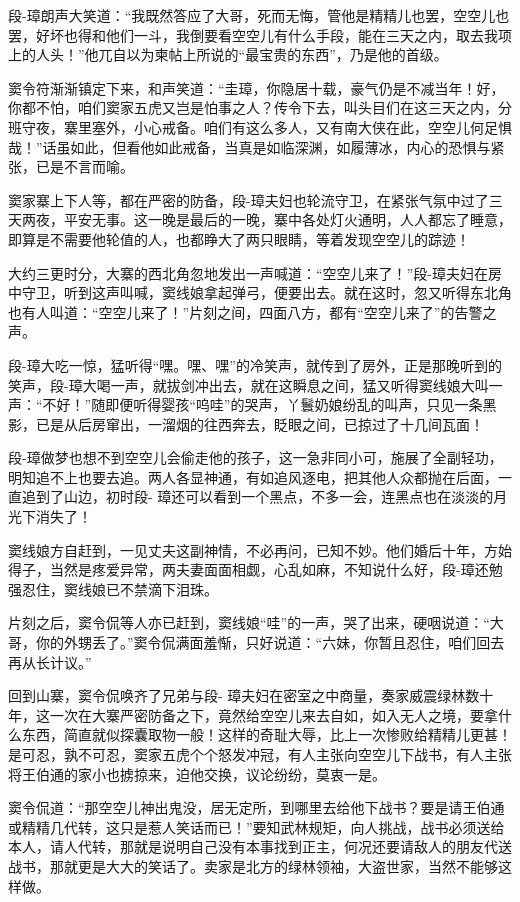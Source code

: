 \documentclass[12pt,oneside]{book}
\begin{document}
段-璋朗声大笑道：``我既然答应了大哥，死而无悔，管他是精精儿也罢，空空儿也罢，好坏也得和他们一斗，我倒要看空空儿有什么手段，能在三天之内，取去我项上的人头！''他兀自以为柬帖上所说的``最宝贵的东西''，乃是他的首级。

窦令符渐渐镇定下来，和声笑道：``圭璋，你隐居十载，豪气仍是不减当年！好，你都不怕，咱们窦家五虎又岂是怕事之人？传令下去，叫头目们在这三天之内，分班守夜，寨里塞外，小心戒备。咱们有这么多人，又有南大侠在此，空空儿何足惧哉！''话虽如此，但看他如此戒备，当真是如临深渊，如履薄冰，内心的恐惧与紧张，已是不言而喻。

窦家寨上下人等，都在严密的防备，段-璋夫妇也轮流守卫，在紧张气氛中过了三天两夜，平安无事。这一晚是最后的一晚，寨中各处灯火通明，人人都忘了睡意，即算是不需要他轮值的人，也都睁大了两只眼睛，等着发现空空儿的踪迹！

大约三更时分，大寨的西北角忽地发出一声喊道：``空空儿来了！''段-璋夫妇在房中守卫，听到这声叫喊，窦线娘拿起弹弓，便要出去。就在这时，忽又听得东北角也有人叫道：``空空儿来了！''片刻之间，四面八方，都有``空空儿来了''的告警之声。

段-璋大吃一惊，猛听得``嘿。嘿、嘿''的冷笑声，就传到了房外，正是那晚听到的笑声，段-璋大喝一声，就拔剑冲出去，就在这瞬息之间，猛又听得窦线娘大叫一声：``不好！''随即便听得婴孩``呜哇''的哭声，丫鬟奶娘纷乱的叫声，只见一条黑影，已是从后房窜出，一溜烟的往西奔去，眨眼之间，已掠过了十几间瓦面！

段-璋做梦也想不到空空儿会偷走他的孩子，这一急非同小可，施展了全副轻功，明知追不上也要去追。两人各显神通，有如追风逐电，把其他人众都抛在后面，一直追到了山边，初时段-
璋还可以看到一个黑点，不多一会，连黑点也在淡淡的月光下消失了！

窦线娘方自赶到，一见丈夫这副神情，不必再问，已知不妙。他们婚后十年，方始得子，当然是疼爱异常，两夫妻面面相觑，心乱如麻，不知说什么好，段-璋还勉强忍住，窦线娘已不禁滴下泪珠。

片刻之后，窦令侃等人亦已赶到，窦线娘``哇''的一声，哭了出来，硬咽说道：``大哥，你的外甥丢了。''窦令侃满面羞惭，只好说道：``六妹，你暂且忍住，咱们回去再从长计议。''

回到山寨，窦令侃唤齐了兄弟与段-
璋夫妇在密室之中商量，奏家威震绿林数十年，这一次在大寨严密防备之下，竟然给空空儿来去自如，如入无人之境，要拿什么东西，简直就似探囊取物一般！这样的奇耻大辱，比上一次惨败给精精儿更甚！是可忍，孰不可忍，窦家五虎个个怒发冲冠，有人主张向空空儿下战书，有人主张将王伯通的家小也掳掠来，迫他交换，议论纷纷，莫衷一是。

窦令侃道：``那空空儿神出鬼没，居无定所，到哪里去给他下战书？要是请王伯通或精精几代转，这只是惹人笑话而已！''要知武林规矩，向人挑战，战书必须送给本人，请人代转，那就是说明自己没有本事找到正主，何况还要请敌人的朋友代送战书，那就更是大大的笑话了。卖家是北方的绿林领袖，大盗世家，当然不能够这样做。
\end{document}
